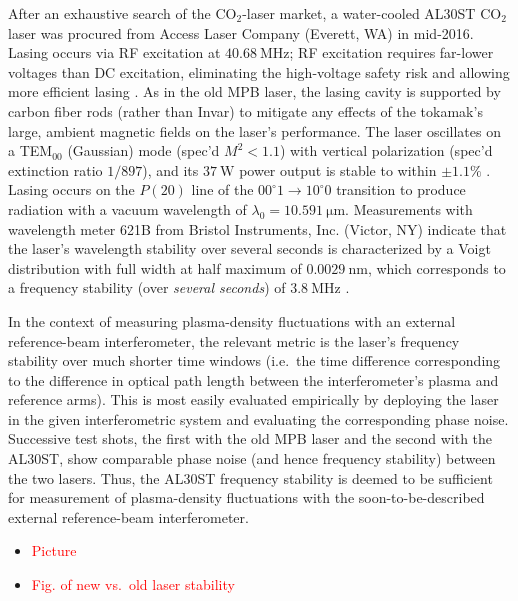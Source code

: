 After an exhaustive search of the CO$_2$-laser market,
a water-cooled AL30ST CO$_2$ laser was procured
from Access Laser Company (Everett, WA) in mid-2016.
Lasing occurs via RF excitation at $\SI{40.68}{\mega\hertz}$;
RF excitation requires far-lower voltages than DC excitation,
eliminating the high-voltage safety risk and allowing more efficient lasing
\cite{he_jap83}.
As in the old MPB laser,
the lasing cavity is supported by carbon fiber rods (rather than Invar)
to mitigate any effects of the tokamak's large, ambient magnetic fields
on the laser's performance.
The laser oscillates on a TEM$_{00}$ (Gaussian) mode (spec'd $M^2 < 1.1$)
with vertical polarization (spec'd extinction ratio $1 / 897$), and
its $\SI{37}{\watt}$ power output is stable to within $\pm 1.1\%$
\cite{marinoni_AL30ST_report}.
Lasing occurs on the $P(20)$ line
of the $00^{\circ}1 \rightarrow 10^{\circ}0$ transition
to produce radiation with a vacuum wavelength of
$\lambda_0 = \SI{10.591}{\micro\meter}$.
Measurements with wavelength meter 621B
from Bristol Instruments, Inc. (Victor, NY)
indicate that the laser's wavelength stability over several seconds
is characterized by a Voigt distribution with
full width at half maximum of $\SI{0.0029}{\nano\meter}$, which
corresponds to a frequency stability (over \emph{several seconds})
of $\SI{3.8}{\mega\hertz}$ \cite{marinoni_AL30ST_report}.

In the context of measuring plasma-density fluctuations
with an external reference-beam interferometer,
the relevant metric is the laser's frequency stability
over much shorter time windows
(i.e.\ the time difference corresponding to
the difference in optical path length between
the interferometer's plasma and reference arms).
This is most easily evaluated empirically
by deploying the laser in the given interferometric system
and evaluating the corresponding phase noise.
Successive test shots,
the first with the old MPB laser and the second with the AL30ST,
show comparable phase noise (and hence frequency stability)
between the two lasers.
Thus, the AL30ST frequency stability is deemed to be sufficient
for measurement of plasma-density fluctuations
with the soon-to-be-described external reference-beam interferometer.

\begin{itemize}
  \item \textcolor{red}{Picture}
  \item \textcolor{red}{Fig. of new vs.\ old laser stability}
\end{itemize}


